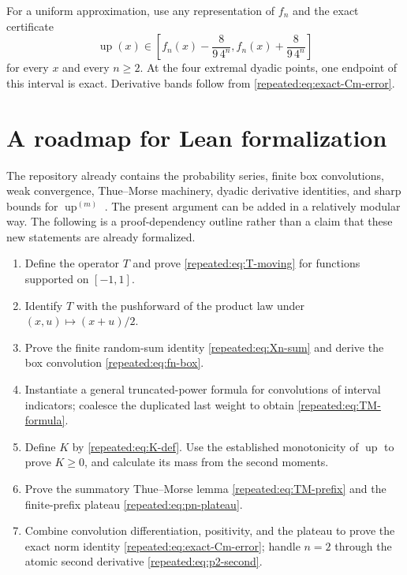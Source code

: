 \documentclass[11pt,oneside]{article}
\theoremstyle{definition}
\theoremstyle{remark}
\newcommand{\Up}{\operatorname{up}}
\begin{document}
For a uniform approximation, use any representation of $f_n$ and the exact certificate
\begin{equation}
 \Up(x)\in\left[f_n(x)-\frac8{9\,4^n},
                 f_n(x)+\frac8{9\,4^n}\right]             \label{repeated:eq:certified-band}
\end{equation}
for every $x$ and every $n\ge2$.  At the four extremal dyadic points, one endpoint of this
interval is exact.  Derivative bands follow from \eqref{repeated:eq:exact-Cm-error}.

\section{A roadmap for Lean formalization}
\label{repeated:sec:Lean-roadmap}

The repository already contains the probability series, finite box convolutions, weak
convergence, Thue--Morse machinery, dyadic derivative identities, and sharp bounds for
$\Up^{(m)}$ \cite{repeated:proveit}.  The present argument can be added in a relatively modular way.
The following is a proof-dependency outline rather than a claim that these new statements are
already formalized.

\begin{enumerate}
\item Define the operator $T$ and prove \eqref{repeated:eq:T-moving} for functions supported on
      $[-1,1]$.
\item Identify $T$ with the pushforward of the product law under $(x,u)\mapsto(x+u)/2$.
\item Prove the finite random-sum identity \eqref{repeated:eq:Xn-sum} and derive the box convolution
      \eqref{repeated:eq:fn-box}.
\item Instantiate a general truncated-power formula for convolutions of interval indicators;
      coalesce the duplicated last weight to obtain \eqref{repeated:eq:TM-formula}.
\item Define $K$ by \eqref{repeated:eq:K-def}.  Use the established monotonicity of $\Up$ to prove
      $K\ge0$, and calculate its mass from the second moments.
\item Prove the summatory Thue--Morse lemma \eqref{repeated:eq:TM-prefix} and the finite-prefix plateau
      \eqref{repeated:eq:pn-plateau}.
\item Combine convolution differentiation, positivity, and the plateau to prove the exact
      norm identity \eqref{repeated:eq:exact-Cm-error}; handle $n=2$ through the atomic second
      derivative \eqref{repeated:eq:p2-second}.
\end{enumerate}
\end{document}
